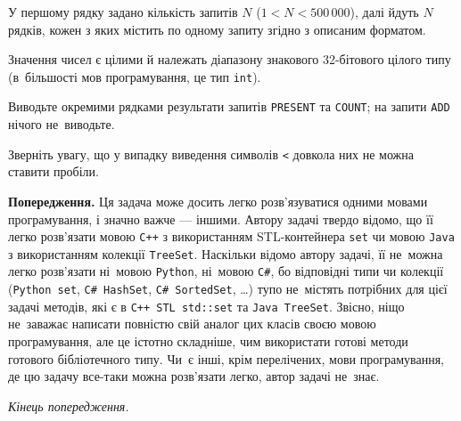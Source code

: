 \InputFile

У першому рядку задано кількість запитів $N$ ($1 < N < 500\,000$), далі йдуть $N$ рядків, кожен з яких містить по одному запиту згідно з описаним форматом.

Значення чисел є цілими й належать діапазону знакового 32-бітового цілого типу (в~більшості мов програмування, це тип {\tt int}).


\OutputFile

Виводьте окремими рядками результати запитів {\tt PRESENT} та {\tt COUNT}; на запити {\tt ADD} нічого не~виводьте.

Зверніть увагу, що у випадку виведення символів {\tt <} довкола них не можна ставити пробіли. 

\Examples

\begin{example}
\end{example}

{\bf Попередження.} Ця задача може досить легко розв'язуватися одними мовами програмування, і значно важче --- іншими. Автору задачі твердо відомо, що її легко розв'язати мовою {\tt C++} з використанням STL-контейнера {\tt set} чи мовою {\tt Java} з використанням колекції {\tt TreeSet}. Наскільки відомо автору задачі, її не~можна легко розв'язати ні~мовою {\tt Python}, ні~мовою {\tt C\#}, бо відповідні типи чи колекції ({\tt Python set}, {\tt C\# HashSet}, {\tt C\# SortedSet}, \dots) тупо не~містять потрібних для цієї задачі методів, які є в {\tt C++ STL std::set} та {\tt Java TreeSet}. Звісно, ніщо не~заважає написати повністю свій аналог цих класів своєю мовою програмування, але це істотно складніше, чим використати готові методи готового бібліотечного типу. Чи~є інші, крім перелічених, мови програмування, де цю задачу все-таки можна розв'язати легко, автор задачі не~знає.

{\it Кінець попередження.}
